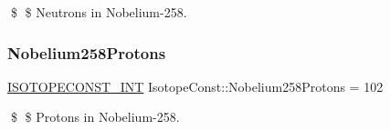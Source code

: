 \$ \$ Neutrons in Nobelium-\/258. \mbox{\label{group___isotope_const-_nobelium-_no258_ga7330b7c22856805e66a57476ead1345e}} 
\subsubsection{\texorpdfstring{Nobelium258\+Protons}{Nobelium258Protons}}
{\footnotesize\ttfamily \mbox{\hyperlink{group___isotope_const-_macros_ga5f18360b3e99483a35c32d789e62621c}{I\+S\+O\+T\+O\+P\+E\+C\+O\+N\+S\+T\+\_\+\+I\+NT}} Isotope\+Const\+::\+Nobelium258\+Protons = 102}

\$ \$ Protons in Nobelium-\/258. 